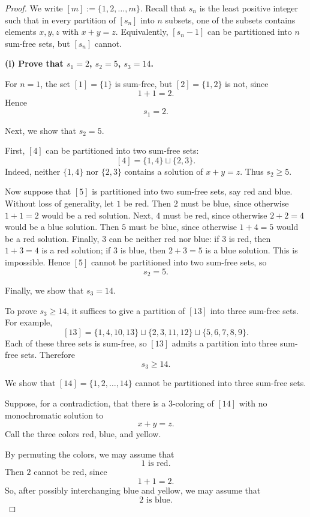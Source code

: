 \documentclass[11pt, a4paper]{ctexrep}
\begin{document}
\begin{proof}
    We write $[m]:=\{1,2,\dots,m\}$. Recall that $s_n$ is the least positive integer such that in every partition of $[s_n]$ into $n$ subsets, one of the subsets contains elements $x,y,z$ with $x+y=z$. Equivalently, $[s_n-1]$ can be partitioned into $n$ sum-free sets, but $[s_n]$ cannot.

    \medskip

    \noindent\textbf{(i) Prove that $s_1=2$, $s_2=5$, $s_3=14$.}

    \smallskip

    For $n=1$, the set $[1]=\{1\}$ is sum-free, but $[2]=\{1,2\}$ is not, since
    \[
        1+1=2.
    \]
    Hence
    \[
        s_1=2.
    \]

    Next, we show that $s_2=5$.

    First, $[4]$ can be partitioned into two sum-free sets:
    \[
        [4]=\{1,4\}\sqcup \{2,3\}.
    \]
    Indeed, neither $\{1,4\}$ nor $\{2,3\}$ contains a solution of $x+y=z$. Thus $s_2\ge 5$.

    Now suppose that $[5]$ is partitioned into two sum-free sets, say red and blue. Without loss of generality, let $1$ be red. Then $2$ must be blue, since otherwise $1+1=2$ would be a red solution. Next, $4$ must be red, since otherwise $2+2=4$ would be a blue solution. Then $5$ must be blue, since otherwise $1+4=5$ would be a red solution. Finally, $3$ can be neither red nor blue: if $3$ is red, then $1+3=4$ is a red solution; if $3$ is blue, then $2+3=5$ is a blue solution. This is impossible. Hence $[5]$ cannot be partitioned into two sum-free sets, so
    \[
        s_2=5.
    \]

    Finally, we show that $s_3=14$.

    To prove $s_3\ge 14$, it suffices to give a partition of $[13]$ into three sum-free sets. For example,
    \[
        [13]=\{1,4,10,13\}\sqcup \{2,3,11,12\}\sqcup \{5,6,7,8,9\}.
    \]
    Each of these three sets is sum-free, so $[13]$ admits a partition into three sum-free sets. Therefore
    \[
        s_3\ge 14.
    \]

    We show that $[14]=\{1,2,\dots,14\}$ cannot be partitioned into three sum-free sets.

    Suppose, for a contradiction, that there is a $3$-coloring of $[14]$ with no monochromatic solution to
    \[
        x+y=z.
    \]
    Call the three colors red, blue, and yellow.

    By permuting the colors, we may assume that
    \[
        1\text{ is red}.
    \]
    Then $2$ cannot be red, since
    \[
        1+1=2.
    \]
    So, after possibly interchanging blue and yellow, we may assume that
    \[
        2\text{ is blue}.
    \]


\end{proof}
\end{document}
